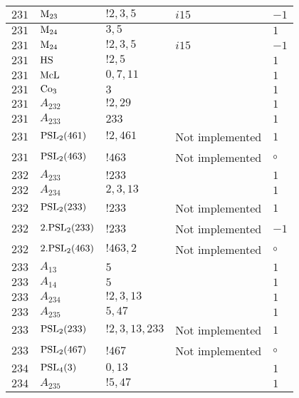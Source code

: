 \documentclass[a4paper, 11pt]{article}
\begin{document}
\begin{longtable}{lllll}
        $ 231 $ & $ {\rm M}_{23} $ & $ ! 2,3,5 $ & $ i15 $ & $ -1$ \\ \hline
        $ 231 $ & $ {\rm M}_{24} $ & $ 3,5 $ & $ ~ $ & $ 1$ \\ \hline
        $ 231 $ & $ {\rm M}_{24} $ & $ ! 2,3,5 $ & $ i15 $ & $ -1$ \\ \hline
        $ 231 $ & $ {\rm HS} $ & $ ! 2,5 $ & $ ~ $ & $ 1$ \\ \hline
        $ 231 $ & $ {\rm McL} $ & $ 0,7,11 $ & $ ~ $ & $ 1$ \\ \hline
        $ 231 $ & $ {\rm Co}_{3} $ & $ 3 $ & $ ~ $ & $ 1$ \\ \hline
        $ 231 $ & $ A_{232} $ & $ !2, 29 $ & $ ~ $ & $ 1$ \\ \hline
        $ 231 $ & $ A_{233} $ & $ 233 $ & $ ~ $ & $ 1$ \\ \hline
        $ 231 $ & $ {\rm PSL}_{2}(461) $ & $ !2, 461 $ &  Not implemented & $ 1$ \\ \hline
        $ 231 $ & $ {\rm PSL}_{2}(463) $ & $ !463 $ &  Not implemented &  $\circ$ \\ \hline
        $ 232 $ & $ A_{233} $ & $ !233 $ & $ ~ $ & $ 1$ \\ \hline
        $ 232 $ & $ A_{234} $ & $ 2, 3, 13 $ & $ ~ $ & $ 1$ \\ \hline
        $ 232 $ & $ {\rm PSL}_{2}(233) $ & $ !233 $ &  Not implemented & $ 1$ \\ \hline
        $ 232 $ & $ 2.{\rm PSL}_{2}(233) $ & $ !233 $ &  Not implemented & $ -1$ \\ \hline
        $ 232 $ & $ 2.{\rm PSL}_{2}(463) $ & $ !463, 2 $ &  Not implemented &  $\circ$ \\ \hline
        $ 233 $ & $ A_{13} $ & $ 5 $ & $ ~ $ & $ 1$ \\ \hline
        $ 233 $ & $ A_{14} $ & $ 5 $ & $ ~ $ & $ 1$ \\ \hline
        $ 233 $ & $ A_{234} $ & $ !2, 3, 13 $ & $ ~ $ & $ 1$ \\ \hline
        $ 233 $ & $ A_{235} $ & $ 5, 47 $ & $ ~ $ & $ 1$ \\ \hline
        $ 233 $ & $ {\rm PSL}_{2}(233) $ & $ !2, 3, 13, 233 $ &  Not implemented & $ 1$ \\ \hline
        $ 233 $ & $ {\rm PSL}_{2}(467) $ & $ !467 $ &  Not implemented &  $\circ$ \\ \hline
        $ 234 $ & $ {\rm PSL}_{4}(3) $ & $ 0,13 $ & $ ~ $ & $ 1$ \\ \hline
        $ 234 $ & $ A_{235} $ & $ !5, 47 $ & $ ~ $ & $ 1$ \\ \hline

\end{longtable}
\end{document}
